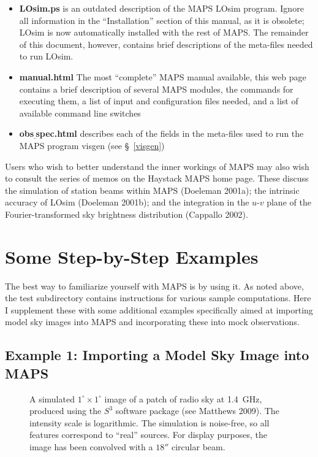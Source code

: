 \documentclass[12pt,psfig]{article}
\begin{document}
\begin{itemize}

\item {\bf LOsim.ps} is an outdated
description of the MAPS {\sf LOsim} program. 
Ignore all information in
the ``Installation'' section of this manual, as it is obsolete; {\sf LOsim} is
now automatically installed with the rest of MAPS. The remainder of this
document, however, contains brief descriptions of the
meta-files needed to run LOsim.

\item {\bf manual.html} The most ``complete'' MAPS manual
  available, this web page contains a brief description of several
  MAPS modules, the commands for executing them, a list of
  input and configuration files needed, and a list of available command line
  switches

\item {\bf obs$\underline~$spec.html} describes each of the fields in
  the meta-files used to run the MAPS program 
{\sf visgen} (see \S~\ref{visgen})

\end{itemize}

\noindent Users who wish to better understand the inner
workings of MAPS may also wish to consult the series of memos
on the Haystack MAPS home page. These discuss
the simulation of
station beams within MAPS (Doeleman 2001a);   the intrinsic accuracy
of LOsim (Doeleman 2001b); and the integration in the $u$-$v$ plane of
the Fourier-transformed sky brightness distribution (Cappallo 2002).



\section{Some Step-by-Step Examples}
%
The best way to familiarize yourself with MAPS is by using it. As noted
above, the {\sf test} subdirectory contains instructions for various
sample computations. Here I supplement these 
with some additional 
examples specifically 
aimed at importing model sky images into MAPS and incorporating
these into mock observations. 

\subsection{Example 1: Importing a Model Sky Image into MAPS}
%

\begin{figure}
\vspace{2in}

\vspace{1cm}
\caption{A simulated $1^{\circ}\times1^{\circ}$ image of
a patch of radio sky at 1.4~GHz, 
produced using the $S^{3}$ software package (see
Matthews 2009). The  intensity scale is logarithmic. The simulation is
noise-free, so all features
correspond to ``real'' sources. For display purposes, the image has
been convolved with a $18''$ circular beam.}
\end{figure}
\end{document}
